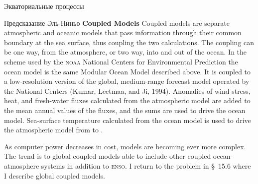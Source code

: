 \begin{chapter}{Экваториальные процессы}
\begin{section}{Предсказание Эль-Ниньо}
\textbf{Coupled Models} Coupled models are separate atmospheric and oceanic models that pass information
through their common boundary at the sea surface, thus coupling the
two calculations. The coupling can be one way, from the atmosphere, or
two way, into and out of the ocean. In the scheme used by the
\textsc{noaa} National Centers for Environmental Prediction the ocean
model is the same Modular Ocean Model described above. It is coupled
to a low-resolution version of the global, medium-range forecast model
operated by the National Centers (Kumar, Leetmaa, and Ji,
1994). Anomalies of wind
stress, heat, and fresh-water fluxes
calculated from the atmospheric model are added to the mean annual
values of the fluxes, and the sums are used to drive the ocean
model. Sea-surface temperature calculated from the ocean model is used
to drive the atmospheric model from  to .
%

As computer power decreases in cost, models are becoming ever more
complex. The trend is to global coupled models able to include other
coupled ocean-atmosphere systems in addition to
\textsc{enso}. I return to the problem in \S~15.6 where I
describe global coupled models.
%


\end{section}
\end{chapter}
